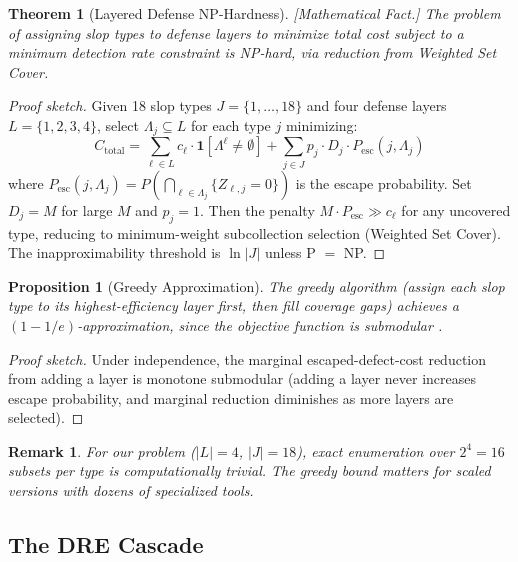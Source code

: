 \documentclass[11pt, a4paper, logo, copyright]{googledeepmind}
\newtheorem{theorem}{Theorem}[section]
\newtheorem{proposition}{Proposition}[section]
\newtheorem*{remark}{Remark}
\begin{document}
\begin{theorem}[Layered Defense NP-Hardness]
\label{thm:defense-nphard}
\emph{[Mathematical Fact.]} The problem of assigning slop types to defense layers to minimize total cost subject to a minimum detection rate constraint is NP-hard, via reduction from Weighted Set Cover.
\end{theorem}

\begin{proof}[Proof sketch]
Given 18 slop types $J = \{1, \ldots, 18\}$ and four defense layers $L = \{1, 2, 3, 4\}$, select $\Lambda_j \subseteq L$ for each type $j$ minimizing:
\begin{equation}
C_{\mathrm{total}} = \sum_{\ell \in L} c_\ell \cdot \mathbf{1}[\Lambda^\ell \neq \emptyset] + \sum_{j \in J} p_j \cdot D_j \cdot P_{\mathrm{esc}}(j, \Lambda_j)
\end{equation}
where $P_{\mathrm{esc}}(j, \Lambda_j) = P(\bigcap_{\ell \in \Lambda_j} \{Z_{\ell,j} = 0\})$ is the escape probability. Set $D_j = M$ for large $M$ and $p_j = 1$. Then the penalty $M \cdot P_{\mathrm{esc}} \gg c_\ell$ for any uncovered type, reducing to minimum-weight subcollection selection (Weighted Set Cover). The inapproximability threshold is $\ln |J|$ unless P $=$ NP.
\end{proof}

\begin{proposition}[Greedy Approximation]
\label{prop:greedy}
The greedy algorithm (assign each slop type to its highest-efficiency layer first, then fill coverage gaps) achieves a $(1-1/e)$-approximation, since the objective function is submodular \citep{nemhauser1978}.
\end{proposition}

\begin{proof}[Proof sketch]
Under independence, the marginal escaped-defect-cost reduction from adding a layer is monotone submodular (adding a layer never increases escape probability, and marginal reduction diminishes as more layers are selected).
\end{proof}

\begin{remark}
For our problem ($|L| = 4$, $|J| = 18$), exact enumeration over $2^4 = 16$ subsets per type is computationally trivial. The greedy bound matters for scaled versions with dozens of specialized tools.
\end{remark}

\subsection{The DRE Cascade}
\end{document}
